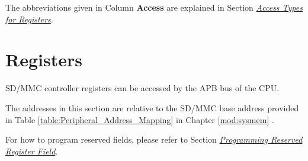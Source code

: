 \documentclass[main\_\_EN.tex]{subfiles}
\begin{document}
The abbreviations given in Column \textbf{Access} are explained in Section \hyperref[glossary-access-types]{\textit{Access Types for Registers}}.




\section{Registers}

SD/MMC controller registers can be accessed by the APB bus of the CPU.

The addresses in this section are relative to the SD/MMC base address provided in Table \ref{table:Peripheral_Address_Mapping} in Chapter \ref{mod:sysmem} \textit{}.

For how to program reserved fields, please refer to Section \hyperref[programming-reserved-field]{\textit{Programming Reserved Register Field}}.



\end{document}
